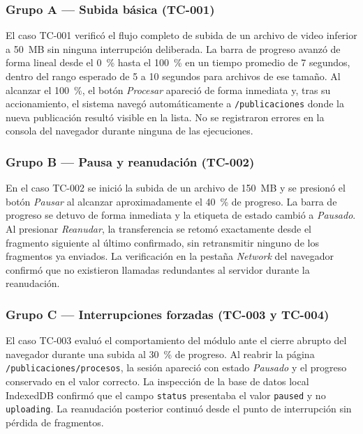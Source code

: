 \subsubsection*{Grupo A — Subida básica (TC-001)}

El caso TC-001 verificó el flujo completo de subida de un archivo de video inferior a 50~MB sin
ninguna interrupción deliberada. La barra de progreso avanzó de forma lineal desde el 0~\% hasta el
100~\% en un tiempo promedio de 7 segundos, dentro del rango esperado de 5 a 10 segundos para
archivos de ese tamaño. Al alcanzar el 100~\%, el botón \textit{Procesar} apareció de forma
inmediata y, tras su accionamiento, el sistema navegó automáticamente a \texttt{/publicaciones}
donde la nueva publicación resultó visible en la lista. No se registraron errores en la consola del
navegador durante ninguna de las ejecuciones.

\subsubsection*{Grupo B — Pausa y reanudación (TC-002)}

En el caso TC-002 se inició la subida de un archivo de 150~MB y se presionó el botón \textit{Pausar}
al alcanzar aproximadamente el 40~\% de progreso. La barra de progreso se detuvo de forma inmediata
y la etiqueta de estado cambió a \textit{Pausado}. Al presionar \textit{Reanudar}, la transferencia
se retomó exactamente desde el fragmento siguiente al último confirmado, sin retransmitir ninguno
de los fragmentos ya enviados. La verificación en la pestaña \textit{Network} del navegador confirmó
que no existieron llamadas redundantes al servidor durante la reanudación.

\subsubsection*{Grupo C — Interrupciones forzadas (TC-003 y TC-004)}

El caso TC-003 evaluó el comportamiento del módulo ante el cierre abrupto del navegador durante una
subida al 30~\% de progreso. Al reabrir la página \texttt{/publicaciones/procesos}, la sesión
apareció con estado \textit{Pausado} y el progreso conservado en el valor correcto. La inspección
de la base de datos local IndexedDB confirmó que el campo \texttt{status} presentaba el valor
\texttt{paused} y no \texttt{uploading}. La reanudación posterior continuó desde el punto de
interrupción sin pérdida de fragmentos.

